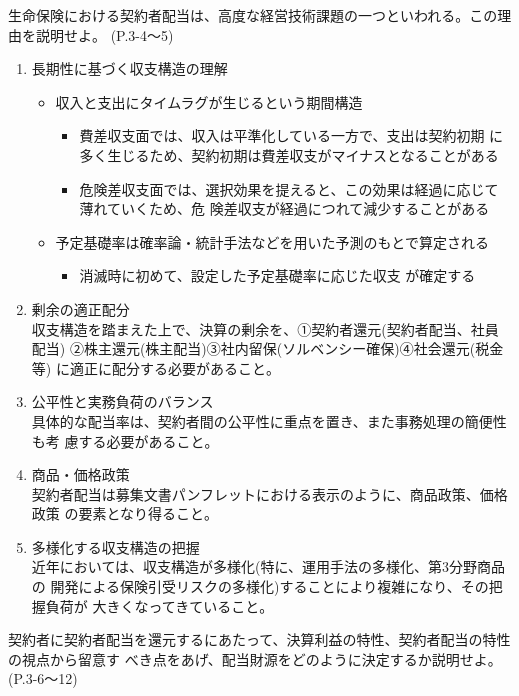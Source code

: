 \documentclass[report,gutter=10mm,fore-edge=10mm,uplatex,dvipdfmx]{jlreq}
\begin{document}
生命保険における契約者配当は、高度な経営技術課題の一つといわれる。この理由を説明せよ。
(P.3-4〜5)
\begin{enumerate}
 \item 長期性に基づく収支構造の理解
\begin{itemize}
 \item 収入と支出にタイムラグが生じるという期間構造
\begin{itemize}
 \item 費差収支面では、収入は平準化している一方で、支出は契約初期
に多く生じるため、契約初期は費差収支がマイナスとなることがある
 \item 危険差収支面では、選択効果を提えると、この効果は経過に応じて薄れていくため、危
険差収支が経過につれて減少することがある
\end{itemize}
 \item 予定基礎率は確率論・統計手法などを用いた予測のもとで算定される
\begin{itemize}
 \item 消滅時に初めて、設定した予定基礎率に応じた収支
が確定する
\end{itemize}
\end{itemize}
 \item 剰余の適正配分\\
収支構造を踏まえた上で、決算の剰余を、①契約者還元(契約者配当、社員配当)
②株主還元(株主配当)③社内留保(ソルベンシー確保)④社会還元(税金等)
に適正に配分する必要があること。
 \item 公平性と実務負荷のバランス\\
具体的な配当率は、契約者間の公平性に重点を置き、また事務処理の簡便性も考
慮する必要があること。
 \item 商品・価格政策\\
契約者配当は募集文書パンフレットにおける表示のように、商品政策、価格政策
の要素となり得ること。
 \item 多様化する収支構造の把握\\
近年においては、収支構造が多様化(特に、運用手法の多様化、第3分野商品の
開発による保険引受リスクの多様化)することにより複雑になり、その把握負荷が
大きくなってきていること。
\end{enumerate}
契約者に契約者配当を還元するにあたって、決算利益の特性、契約者配当の特性の視点から留意す
べき点をあげ、配当財源をどのように決定するか説明せよ。
(P.3-6～12)
\end{document}
